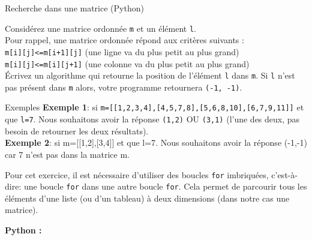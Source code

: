 \begin{Exercice}[20 minutes] Recherche dans une matrice (Python) %
    

    Considérez une matrice ordonnée \lstinline{m} et un élément \lstinline{l}.\\
    
    Pour rappel, une matrice ordonnée répond aux critères suivants :\\
     \lstinline{m[i][j]<=m[i+1][j]} (une ligne va du plus petit au plus grand)\\
     \lstinline{m[i][j]<=m[i][j+1]} (une colonne va du plus petit au plus grand)\\
 
    
    Écrivez un algorithme qui retourne la position de l’élément \lstinline{l} dans \lstinline{m}. Si \lstinline{l} n’est pas présent dans \lstinline{m} alors, votre programme retournera \lstinline{(-1, -1)}.\\
    
    \begin{Example}{\faTerminal \quad Exemples}
        \textbf{Exemple 1}: si \lstinline{m=[[1,2,3,4],[4,5,7,8],[5,6,8,10],[6,7,9,11]]} et que \lstinline{l=7}. Nous souhaitons avoir la réponse \lstinline{(1,2)} OU \lstinline{(3,1)} (l’une des deux, pas besoin de retourner les deux résultats).\\

        \textbf{Exemple 2}: si m=[[1,2],[3,4]] et que l=7. Nous souhaitons avoir la réponse (-1,-1) car 7 n’est pas dans la matrice m.
    \end{Example}

    

    \begin{conseil}
    Pour cet exercice, il est nécessaire d'utiliser des boucles \lstinline{for} imbriquées, c'est-à-dire: une boucle \lstinline{for} dans une autre boucle \lstinline{for}. Cela permet de parcourir tous les éléments d'une liste (ou d'un tableau) à deux dimensions (dans notre cas une matrice). 
    \end{conseil}

    \begin{solution}
        \textbf{Python :}
        
    \end{solution}

\end{Exercice}


